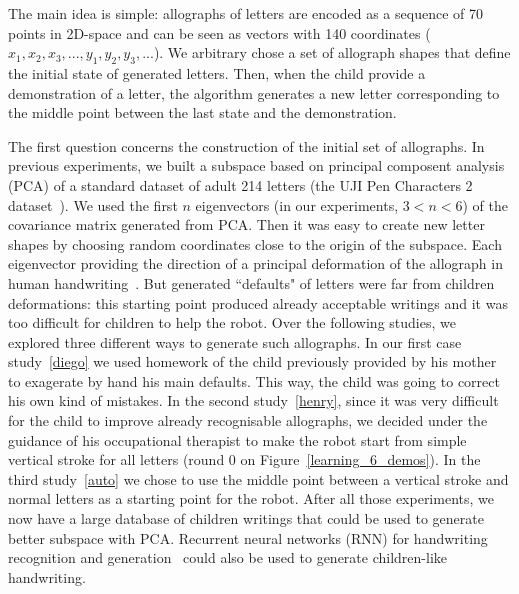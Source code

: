 \documentclass{sig-alternate}
\begin{document}
The main idea is simple: allographs of letters are encoded as a sequence of 70 points in
2D-space and can be seen as vectors with 140 coordinates
($x_1,x_2,x_3,...,y_1,y_2,y_3,...$). We arbitrary chose a set of allograph shapes
that define the initial state of generated letters. 
Then, when the child provide a demonstration of a letter, the algorithm
generates
a new letter corresponding to the middle point between the last state and the
demonstration. 

The first question concerns the construction of the initial set of allographs.
In previous experiments, we built a subspace based on principal composent
analysis (PCA) of a standard dataset of adult 214 letters (the UJI Pen Characters 2 dataset~\cite{Llorens2008}).
We used the first $n$ eigenvectors (in
our experiments, $3 < n < 6$) of the covariance matrix
generated from PCA. Then it was easy to create new letter shapes by choosing
random coordinates close to the origin of the subspace. Each eigenvector
providing the direction of a principal deformation of the allograph in human
handwriting~\cite{Hood}. But generated ``defaults" of letters were far from
children deformations: this starting point produced already acceptable writings
and it was too difficult for children to help the robot.
Over the following studies, we explored three different ways to generate such
allographs. In our first case study~\ref{diego} we used homework of the child previously provided
by his mother to exagerate by hand his main defaults. This way, the child was
going to correct his own kind of mistakes. In the second study~\ref{henry},
since it was very
difficult for the child to improve already recognisable allographs, we decided under the
guidance of his occupational therapist to make the robot start from simple
vertical stroke for all letters (round 0 on Figure~\ref{learning_6_demos}). In
the third study~\ref{auto} we chose to use the middle point between a vertical stroke
and normal letters as a starting point for the robot. After all those
experiments, we now have a large database of children writings that could be
used to generate better subspace with PCA. Recurrent neural networks (RNN)
for handwriting recognition and generation~\cite{DBLP:journals/corr/Graves13}
could also be used to generate children-like handwriting. 
\end{document}
